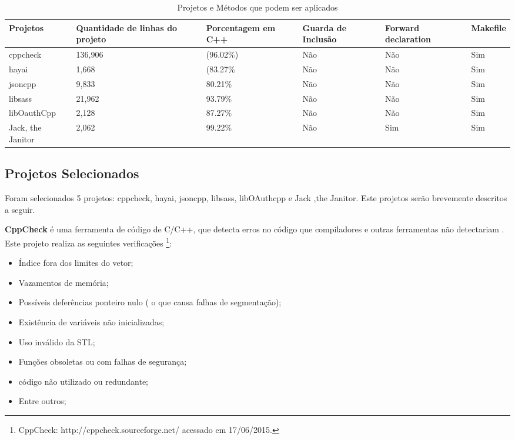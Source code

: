 \begin{table}[h]
\centering
\begin{tabular}{|l|p{2cm}|p{2cm}|p{2cm}|p{2cm}|p{2cm}|}
	\hline
	Projetos & Quantidade de linhas do projeto & Porcentagem em C++ &
	Guarda de Inclusão & Forward declaration & Makefile \\
	\hline
	cppcheck & 136,906 & (96.02\%) & Não & Não & Sim \\
	\hline
	hayai & 1,668 & (83.27\% & Não & Não & Sim \\
	\hline
	jsoncpp & 9,833 & 80.21\% & Não & Não & Sim \\
	\hline
	libsass & 21,962 & 93.79\% & Não & Não & Sim \\
	\hline
	libOauthCpp & 2,128 & 87.27\% & Não & Não & Sim \\
	\hline
	Jack, the Janitor & 2,062 & 99.22\% & Não & Sim & Sim \\
	\hline
\end{tabular}
\caption{Projetos e Métodos que podem ser aplicados}
\label{tab:projects}
\end{table}

\subsection{Projetos Selecionados}

Foram selecionados 5 projetos: cppcheck, hayai, jsoncpp, libsass,
 libOAuthcpp e Jack ,the Janitor. Este projetos serão brevemente 
descritos a seguir.

\textbf{CppCheck} é uma ferramenta de código de C/C++, que detecta erros no código
 que compiladores e outras ferramentas não detectariam . Este projeto realiza
 as seguintes verificações \footnote{CppCheck: http://cppcheck.sourceforge.net/
  acessado em 17/06/2015.}:

\begin{itemize}
	\item Índice fora dos limites do vetor;    
    \item Vazamentos de memória;
    \item Possíveis deferências ponteiro nulo ( o que causa falhas de segmentação);
	\item Existência de variáveis não inicializadas;
	\item Uso inválido da STL;
	\item Funções obsoletas ou com falhas de segurança; 
	\item código não utilizado ou redundante;
	\item Entre outros;
\end{itemize}


